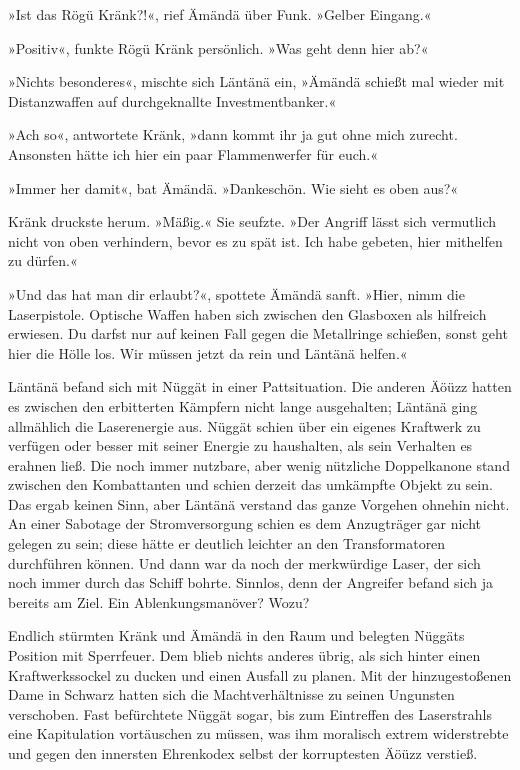 »Ist das Rögü Kränk?!«, rief Ämändä über Funk. »Gelber Eingang.«

»Positiv«, funkte Rögü Kränk persönlich. »Was geht denn hier ab?«

»Nichts besonderes«, mischte sich Läntänä ein, »Ämändä schießt mal wieder mit Distanzwaffen auf durchgeknallte Investmentbanker.«

»Ach so«, antwortete Kränk, »dann kommt ihr ja gut ohne mich zurecht. Ansonsten hätte ich hier ein paar Flammenwerfer für euch.«

»Immer her damit«, bat Ämändä. »Dankeschön. Wie sieht es oben aus?«

Kränk druckste herum. »Mäßig.« Sie seufzte. »Der Angriff lässt sich vermutlich nicht von oben verhindern, bevor es zu spät ist. Ich habe gebeten, hier mithelfen zu dürfen.«

»Und das hat man dir erlaubt?«, spottete Ämändä sanft. »Hier, nimm die Laserpistole. Optische Waffen haben sich zwischen den Glasboxen als hilfreich erwiesen. Du darfst nur auf keinen Fall gegen die Metallringe schießen, sonst geht hier die Hölle los. Wir müssen jetzt da rein und Läntänä helfen.«

Läntänä befand sich mit Nüggät in einer Pattsituation. Die anderen Äöüzz hatten es zwischen den erbitterten Kämpfern nicht lange ausgehalten; Läntänä ging allmählich die Laserenergie aus. Nüggät schien über ein eigenes Kraftwerk zu verfügen oder besser mit seiner Energie zu haushalten, als sein Verhalten es erahnen ließ. Die noch immer nutzbare, aber wenig nützliche Doppelkanone stand zwischen den Kombattanten und schien derzeit das umkämpfte Objekt zu sein. Das ergab keinen Sinn, aber Läntänä verstand das ganze Vorgehen ohnehin nicht. An einer Sabotage der Stromversorgung schien es dem Anzugträger gar nicht gelegen zu sein; diese hätte er deutlich leichter an den Transformatoren durchführen können. Und dann war da noch der merkwürdige Laser, der sich noch immer durch das Schiff bohrte. Sinnlos, denn der Angreifer befand sich ja bereits am Ziel. Ein Ablenkungsmanöver? Wozu?

Endlich stürmten Kränk und Ämändä in den Raum und belegten Nüggäts Position mit Sperrfeuer. Dem blieb nichts anderes übrig, als sich hinter einen Kraftwerkssockel zu ducken und einen Ausfall zu planen. Mit der hinzugestoßenen Dame in Schwarz hatten sich die Machtverhältnisse zu seinen Ungunsten verschoben. Fast befürchtete Nüggät sogar, bis zum Eintreffen des Laserstrahls eine Kapitulation vortäuschen zu müssen, was ihm moralisch extrem widerstrebte und gegen den innersten Ehrenkodex selbst der korruptesten Äöüzz verstieß.

